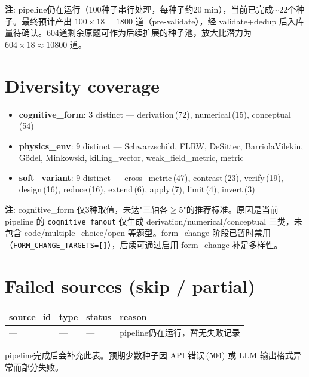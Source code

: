 \documentclass[11pt,a4paper]{article}
\begin{document}
\small\noindent
\textbf{注}: pipeline仍在运行（100种子串行处理，每种子约20 min），当前已完成$\sim$22个种子。最终预计产出 $100\times18=1800$ 道（pre-validate），经 validate+dedup 后入库量待确认。604道剩余原题可作为后续扩展的种子池，放大比潜力为 $604\times18\approx10800$ 道。

\section{Diversity coverage}

\begin{itemize}[nosep]
  \item \textbf{cognitive\_form}: 3 distinct — derivation\,(72), numerical\,(15), conceptual\,(54)
  \item \textbf{physics\_env}: 9 distinct — Schwarzschild, FLRW, DeSitter, BarriolaVilekin, G\"odel, Minkowski, killing\_vector, weak\_field\_metric, metric
  \item \textbf{soft\_variant}: 9 distinct — cross\_metric\,(47), contrast\,(23), verify\,(19), design\,(16), reduce\,(16), extend\,(6), apply\,(7), limit\,(4), invert\,(3)
\end{itemize}

\small\noindent
\textbf{注}: cognitive\_form 仅3种取值，未达"三轴各$\ge$5"的推荐标准。原因是当前 pipeline 的 \texttt{cognitive\_fanout} 仅生成 derivation/numerical/conceptual 三类，未包含 code/multiple\_choice/open 等题型。form\_change 阶段已暂时禁用（\texttt{FORM\_CHANGE\_TARGETS=[]}），后续可通过启用 form\_change 补足多样性。

\section{Failed sources (skip / partial)}

\begin{table}[h]\centering
\begin{tabular}{llll}
\toprule
\textbf{source\_id} & \textbf{type} & \textbf{status} & \textbf{reason} \\
\midrule
— & — & — & pipeline仍在运行，暂无失败记录 \\
\bottomrule
\end{tabular}
\end{table}

\small\noindent
pipeline完成后会补充此表。预期少数种子因 API 错误\,(504) 或 LLM 输出格式异常而部分失败。
\end{document}
